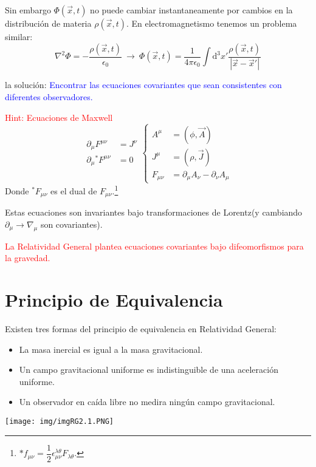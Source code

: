 \documentclass[../main]{subfiles}
\begin{document}
Sin embargo $\Phi(\vec{x}, t)$ no puede cambiar instantaneamente por cambios en la distribución de materia $\rho(\vec{x}, t)$. En electromagnetismo tenemos un problema similar:
\begin{equation}
    \nabla^2 \Phi=-\dfrac{\rho(\vec{x}, t)}{\epsilon_0} \ \rightarrow \ \Phi(\vec{x}, t)=\dfrac{1}{4\pi \epsilon_0}\int \mathrm{d}^3 x' \dfrac{\rho(\vec{x}, t)}{|\vec{x}-\vec{x}'|}
\end{equation}
\begin{adjustwidth}{0pt}{-100pt}
la solución: \textcolor{blue}{Encontrar las ecuaciones covariantes que sean consistentes con diferentes observadores.}

\textcolor{red}{Hint: Ecuaciones de Maxwell}
\begin{equation}
    \begin{aligned}
        \partial_{\mu} F^{\mu\nu}&=J^{\nu} \\
        \partial_{\mu}{}^{*} F^{\mu\nu}&=0
    \end{aligned}
    \left\{
    \begin{aligned}
        A^{\mu}&=(\phi, \vec{A})\\
        J^{\mu}&=(\rho, \vec{J})\\
        F_{\mu\nu}&=\partial_{\mu} A_{\nu}-\partial_{\nu}A_{\mu}
    \end{aligned}
    \right.
\end{equation}
Donde ${}^* F_{\mu\nu}$ es el dual de $F_{\mu\nu}$.\footnote{$*f_{\mu\nu}=\dfrac{1}{2}\epsilon_{\mu\nu}^{\lambda \theta}F_{\lambda\theta}$.} 

Estas ecuaciones son invariantes bajo transformaciones de Lorentz(y cambiando $\partial_{\mu}\rightarrow \nabla_{\mu}$ son covariantes).

\textcolor{red}{La Relatividad General plantea ecuaciones covariantes bajo difeomorfismos para la gravedad.}

\section{Principio de Equivalencia}\label{part2.2}
Existen tres formas del principio de equivalencia en Relatividad General:

\begin{itemize}
    \item La masa inercial es igual a la masa gravitacional.
    \item Un campo gravitacional uniforme es indistinguible de una aceleración uniforme.
    \item Un observador en caída libre no medira ningún campo gravitacional.
\end{itemize}
\begin{center}
    \texttt{[image: img/imgRG2.1.PNG]}
\end{center}


\end{adjustwidth}
\end{document}
